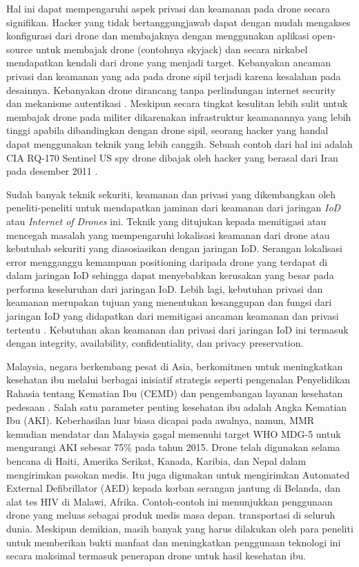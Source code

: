 Hal ini dapat mempengaruhi aspek privasi dan keamanan pada drone secara signifikan. Hacker yang tidak bertanggungjawab dapat dengan mudah mengakses konfigurasi dari drone dan membajaknya dengan menggunakan aplikasi open-source untuk membajak drone (contohnya skyjack) dan secara nirkabel mendapatkan kendali dari drone yang menjadi target. Kebanyakan ancaman privasi dan keamanan yang ada pada drone sipil terjadi karena kesalahan pada desainnya. Kebanyakan drone dirancang tanpa perlindungan internet security dan mekanisme autentikasi \citep{rahman2017smart}. Meskipun secara tingkat kesulitan lebih sulit untuk membajak drone pada militer dikarenakan infrastruktur keamanannya yang lebih tinggi apabila dibandingkan dengan drone sipil, seorang hacker yang handal dapat menggunakan teknik yang lebih canggih. Sebuah contoh dari hal ini adalah CIA RQ-170 Sentinel US spy drone dibajak oleh hacker yang berasal dari Iran pada desember 2011 \citep{mohan2016cybersecurity}.

Sudah banyak teknik sekuriti, keamanan dan privasi yang dikembangkan oleh peneliti-peneliti untuk mendapatkan jaminan dari keamanan dari jaringan \emph{IoD} atau \emph{Internet of Drones} ini. Teknik yang ditujukan kepada memitigasi atau mencegah masalah yang mempengaruhi lokalisasi keamanan dari drone atau kebutuhab sekuriti yang diasosiasikan dengan jaringan IoD. Serangan lokalisasi error mengganggu kemampuan positioning daripada drone yang terdapat di dalam jaringan IoD sehingga dapat menyebabkan kerusakan yang besar pada performa keseluruhan dari jaringan IoD. Lebih lagi, kebutuhan privasi dan keamanan merupakan tujuan yang menentukan kesanggupan dan fungsi dari jaringan IoD yang didapatkan dari memitigasi ancaman keamanan dan privasi tertentu \citep{yahuza2020systematic}. Kebutuhan akan keamanan dan privasi dari jaringan IoD ini termasuk dengan integrity, availability, confidentiality, dan privacy preservation.

Malaysia, negara berkembang pesat di Asia, berkomitmen untuk meningkatkan kesehatan ibu melalui berbagai inisiatif strategis seperti pengenalan Penyelidikan Rahasia tentang Kematian Ibu (CEMD) dan pengembangan layanan kesehatan pedesaan \citep{achanna2018maternal}. Salah satu parameter penting kesehatan ibu adalah Angka Kematian Ibu (AKI). Keberhasilan luar biasa dicapai pada awalnya, namun, MMR kemudian mendatar dan Malaysia gagal memenuhi target WHO MDG-5 untuk mengurangi AKI sebesar 75\% pada tahun 2015. Drone telah digunakan selama bencana di Haiti, Amerika Serikat, Kanada, Karibia, dan Nepal dalam mengirimkan pasokan medis. Itu juga digunakan untuk mengirimkan Automated External Defibrillator (AED) kepada korban serangan jantung di Belanda, dan alat tes HIV di Malawi, Afrika. Contoh-contoh ini menunjukkan penggunaan drone yang meluas sebagai produk medis masa depan. transportasi di seluruh dunia. Meskipun demikian, masih banyak yang harus dilakukan oleh para peneliti untuk memberikan bukti manfaat dan meningkatkan penggunaan teknologi ini secara maksimal termasuk penerapan drone untuk hasil kesehatan ibu.

